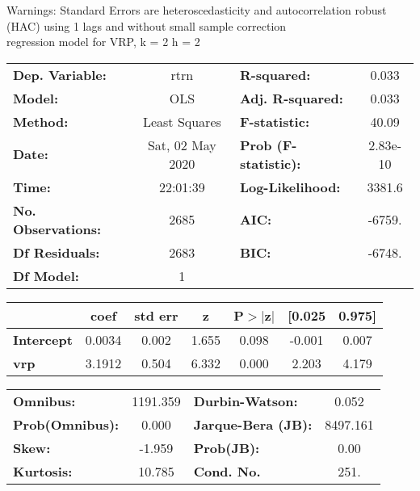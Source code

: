 Warnings: \newline
 [1] Standard Errors are heteroscedasticity and autocorrelation robust (HAC) using 1 lags and without small sample correction\\ 

regression model for VRP, k = 2 h = 2\begin{center}
\begin{tabular}{lclc}
\toprule
\textbf{Dep. Variable:}    &       rtrn       & \textbf{  R-squared:         } &     0.033   \\
\textbf{Model:}            &       OLS        & \textbf{  Adj. R-squared:    } &     0.033   \\
\textbf{Method:}           &  Least Squares   & \textbf{  F-statistic:       } &     40.09   \\
\textbf{Date:}             & Sat, 02 May 2020 & \textbf{  Prob (F-statistic):} &  2.83e-10   \\
\textbf{Time:}             &     22:01:39     & \textbf{  Log-Likelihood:    } &    3381.6   \\
\textbf{No. Observations:} &        2685      & \textbf{  AIC:               } &    -6759.   \\
\textbf{Df Residuals:}     &        2683      & \textbf{  BIC:               } &    -6748.   \\
\textbf{Df Model:}         &           1      & \textbf{                     } &             \\
\bottomrule
\end{tabular}
\begin{tabular}{lcccccc}
                   & \textbf{coef} & \textbf{std err} & \textbf{z} & \textbf{P$> |$z$|$} & \textbf{[0.025} & \textbf{0.975]}  \\
\midrule
\textbf{Intercept} &       0.0034  &        0.002     &     1.655  &         0.098        &       -0.001    &        0.007     \\
\textbf{vrp}       &       3.1912  &        0.504     &     6.332  &         0.000        &        2.203    &        4.179     \\
\bottomrule
\end{tabular}
\begin{tabular}{lclc}
\textbf{Omnibus:}       & 1191.359 & \textbf{  Durbin-Watson:     } &    0.052  \\
\textbf{Prob(Omnibus):} &   0.000  & \textbf{  Jarque-Bera (JB):  } & 8497.161  \\
\textbf{Skew:}          &  -1.959  & \textbf{  Prob(JB):          } &     0.00  \\
\textbf{Kurtosis:}      &  10.785  & \textbf{  Cond. No.          } &     251.  \\
\bottomrule
\end{tabular}
\end{center}

